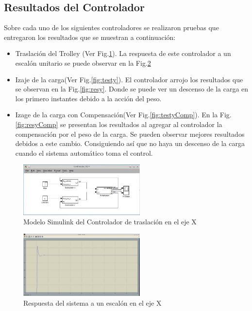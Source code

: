 \documentclass[journal]{IEEEtran}
\begin{document}
\subsection{Resultados del Controlador}
\label{sec:rescontrolador}
Sobre cada uno de los siguientes controladores se realizaron pruebas que
entregaron los resultados que se muestran a continuación:
\begin{itemize}
 \item Traslación del Trolley (Ver Fig.\ref{fig:testx}).
 La respuesta de este controlador a un escalón unitario se puede
 observar en la Fig.\ref{fig:resx}
 \item Izaje de la carga(Ver Fig.\ref{fig:testy}).
 El controlador arrojo los resultados que se observan en la Fig.\ref{fig:resy}. 
 Donde se puede ver un descenso de la carga en los primero instantes debido a la 
 acción del peso.
 \item Izage de la carga con Compensación(Ver Fig.\ref{fig:testyComp}).
 En la Fig.\ref{fig:resyComp} se presentan los resultados al agregar al
 controlador la compensación por el peso de la carga. Se pueden observar mejores
 resultados debidos a este cambio. Consiguiendo así que no haya un descenso de la
 carga cuando el sistema automático toma el control.
\end{itemize}


\begin{figure}[!t]
 \centering
  \includegraphics[width=2.5in]{Test_x.jpeg}
  \caption{Modelo Simulink del Controlador de traslación en el eje X}
  \label{fig:testx}
\end{figure}

\begin{figure}[!t]
 \centering
  \includegraphics[width=2.5in]{Test_x_posicion.jpeg}
  \caption{Respuesta del sistema a un escalón en el eje X}
  \label{fig:resx}
\end{figure}
\end{document}

